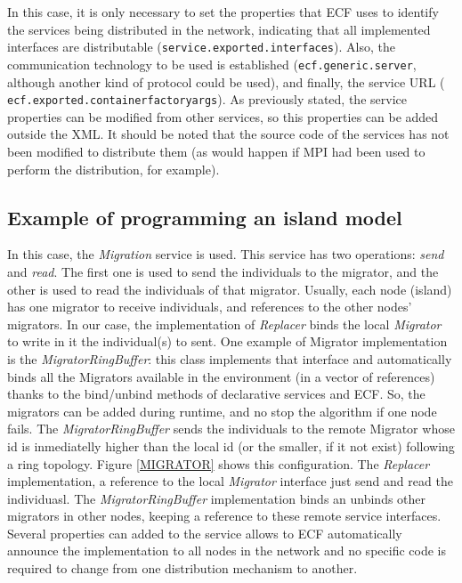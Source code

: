 In this case, it is only necessary to set the properties that ECF uses to identify the services being distributed in the network, indicating that all implemented interfaces are distributable (\texttt{ser\-vi\-ce\-.ex\-por\-ted\-.in\-ter\-fa\-ces}). Also, the communication technology to be used is established (\texttt{ecf\-.ge\-ne\-ric\-.ser\-ver}, although another kind of protocol could be used), and finally, the service URL (\texttt{ ecf\-.ex\-por\-ted\-.con\-tai\-ner\-fac\-to\-ry\-args}). As previously stated, the service properties can be modified from other services, so this properties can be added outside the XML. It should be noted that the source code of the services has not been modified to distribute them (as would happen if MPI had been used to perform the distribution, for example).

\subsection{Example of programming an island model}
\label{subsec:migrator}
In this case, the {\em Migration} service is used. This service has two operations: {\em send} and {\em read}. The first one is used to send the individuals to the migrator, and the other is used to read the individuals of that migrator. Usually, each node (island) has one migrator to receive individuals, and references to the other nodes' migrators. In our case, the implementation of {\em Replacer} binds the local {\em Migrator} to write in it the individual(s) to sent. One example of Migrator implementation is the {\em MigratorRingBuffer}: this class implements that interface and automatically binds all the Migrators available in the environment (in a vector of references) thanks to the bind/unbind methods of declarative services and ECF. So, the migrators can be added during runtime, and no stop the algorithm if one node fails.  The {\em MigratorRingBuffer} sends the individuals to the remote Migrator whose id is inmediatelly higher than the local id (or the smaller, if it not exist) following a ring topology. Figure \ref{MIGRATOR} shows this configuration. The {\em Replacer} implementation, a reference to the local {\em Migrator} interface just send and read the individuasl. The {\em MigratorRingBuffer} implementation binds an unbinds other migrators in other nodes, keeping a reference to these remote service interfaces. Several properties can added to the service allows to ECF automatically announce the implementation to all nodes in the network and no specific code is required to change from one distribution mechanism to another. 

